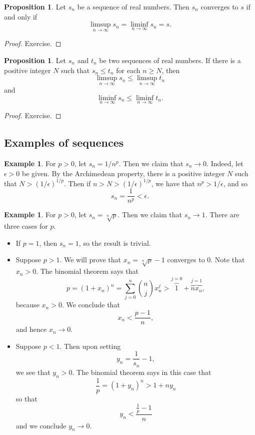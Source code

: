 \documentclass[12pt]{article}
\theoremstyle{definition}
\newtheorem{example}[definition]{Example}
\theoremstyle{theorem}
\newtheorem{proposition}[definition]{Proposition}
\begin{document}
\begin{proposition}
Let $s_n$ be a sequence of real numbers. Then $s_n$ converges to $s$ if and only if 
\[
\limsup_{n \to \infty}s_n = \liminf_{n \to \infty}s_n = s.
\]
\end{proposition}

\begin{proof}
Exercise. 
\end{proof}

\begin{proposition}
Let $s_n$ and $t_n$ be two sequences of real numbers. If there is a positive integer $N$ such that $s_n \leqslant t_n$ for each $n \geqslant N$, then 
\[ 
\limsup_{n \to \infty}s_n \leqslant \limsup_{n \to \infty}t_n
\]
and 
\[
\liminf_{n \to \infty}s_n \leqslant \liminf_{n \to \infty}t_n.
\]
\end{proposition}

\begin{proof}
Exercise. 
\end{proof}

\subsection{Examples of sequences}

\begin{example}
For $p > 0$, let $s_n = 1/n^p$. Then we claim that $s_n \to 0$. Indeed, let $\epsilon > 0$ be given. By the Archimedean property, there is a positive integer $N$ such that $N > (1/\epsilon)^{1/p}$. Then if $n > N > (1/\epsilon)^{1/p}$, we have that $n^p > 1/\epsilon$, and so 
\[
s_n = \frac{1}{n^p} < \epsilon.
\]
\end{example}

\begin{example}
For $p > 0$, let $s_n = \sqrt[n]{p}$. Then we claim that $s_n \to 1$. There are three cases for $p$. 
\begin{itemize}
\item If $p = 1$, then $s_n = 1$, so the result is trivial. 
\item Suppose $p > 1$. We will prove that $x_n = \sqrt[n]{p} - 1$ converges to $0$. Note that $x_n > 0$. The binomial theorem says that 
\[
p = (1 + x_n)^n = \sum_{j=0}^n {{n}\choose{j}}x_n^j > \overbrace{1}^{j=0} + \overbrace{n x_n}^{j=1},
\]
because $x_n > 0$. We conclude that 
\[
x_n < \frac{p-1}{n},
\] 
and hence $x_n \to 0$.
\item Suppose $p < 1$. Then upon setting 
\[
y_n = \frac{1}{s_n} - 1,
\]
we see that $y_n > 0$. The binomial theorem says in this case that 
\[
\frac{1}{p} =(1 + y_n)^n > 1 + ny_n
\]
so that 
\[
y_n < \frac{\frac{1}{p} - 1}{n}
\]
and we conclude $y_n \to 0$. 
\end{itemize}
\end{example}
\end{document}
